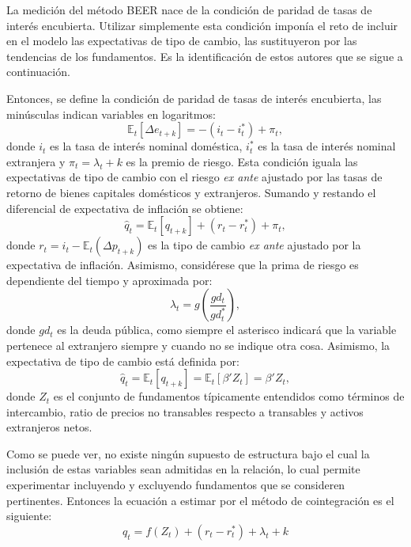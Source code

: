 \documentclass[12pt,letterpaper]{article}
\begin{document}
La medición del método BEER nace de la condición de paridad de tasas de interés encubierta. Utilizar simplemente esta condición imponía el reto de incluir en el modelo las expectativas de tipo de cambio, \cite{clark1999exchange} las sustituyeron por las tendencias de los fundamentos. Es la identificación de estos autores que se sigue a continuación.

Entonces, se define la condición de paridad de tasas de interés encubierta, las minúsculas indican variables en logaritmos:
\begin{equation}
\mathbb{E}_t[\Delta e_{t+k}]=-(i_t-i_t^*)+\pi_t,
\end{equation}
donde $i_t$ es la tasa de interés nominal doméstica, $i_t^*$ es la tasa de interés nominal extranjera y $\pi_t=\lambda_t+k$ es la premio de riesgo. Esta condición iguala las expectativas de tipo de cambio con el riesgo  \emph{ex ante} ajustado por las tasas de retorno de bienes capitales domésticos y extranjeros. Sumando y restando el diferencial de expectativa de inflación se obtiene:
\begin{equation}
\hat{q}_t=\mathbb{E}_t[q_{t+k}]+(r_t-r_t^*)+\pi_t,
\end{equation}
donde $r_t=i_t-\mathbb{E}_t(\Delta p_{t+k})$ es la tipo de cambio \emph{ex ante} ajustado por la expectativa de inflación. Asimismo, considérese que la prima de riesgo es dependiente del tiempo y aproximada por:
\begin{equation}
\lambda_t=g(\frac{gd_t}{gd_t^*}),
\end{equation}
donde $gd_t$ es la deuda pública, como siempre el asterisco indicará que la variable pertenece al extranjero siempre y cuando no se indique otra cosa. Asimismo, la expectativa de tipo de cambio está definida por:
\begin{equation}
\hat{q}_t=\mathbb{E}_t[q_{t+k}]=\mathbb{E}_t[\beta' Z_t]=\beta' Z_t,
\end{equation}
donde $Z_t$ es el conjunto de fundamentos típicamente entendidos como términos de intercambio, ratio de precios no transables respecto a transables y activos extranjeros netos.

Como se puede ver, no existe ningún supuesto de estructura bajo el cual la inclusión de estas variables sean admitidas en la relación, lo cual permite experimentar incluyendo y excluyendo fundamentos que se consideren pertinentes. Entonces la ecuación a estimar por el método de cointegración es el siguiente:
\begin{equation}\label{qb}
q_t=f(Z_t)+(r_t-r_t^*)+\lambda_t+k
\end{equation}
\end{document}
